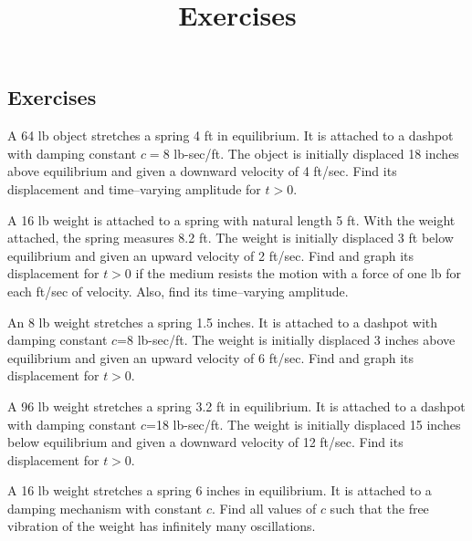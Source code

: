 \documentclass{ximera}
\title{Exercises} \license{CC BY-NC-SA 4.0}
\begin{document}
\begin{abstract}
\end{abstract}
\maketitle

\begin{onlineOnly}
\section*{Exercises}
\end{onlineOnly}

\begin{problem}\label{exer:6.2.1}
A 64 lb object stretches a spring 4 ft in equilibrium. It is attached
to a dashpot with damping constant $c=8$ lb-sec/ft. The object is
initially displaced 18 inches above equilibrium and given a downward
velocity of 4 ft/sec. Find its displacement and time--varying
amplitude for $t>0$.
\end{problem}

\begin{problem}\label{exer:6.2.2}  
A 16 lb weight is attached to a spring with natural length 5 ft. With
the weight attached, the spring measures 8.2 ft. The weight is
initially displaced 3 ft below equilibrium and given an upward
velocity of 2 ft/sec. Find and graph its displacement
 for $t>0$ if the medium resists the motion with a force of
one lb for each ft/sec of velocity. Also, find its time--varying amplitude.
\end{problem}

\begin{problem}\label{exer:6.2.3}  
An 8 lb weight stretches a spring 1.5 inches. It is attached to a
dashpot with damping constant $c$=8 lb-sec/ft. The weight is
initially displaced 3 inches above equilibrium and given an upward
velocity of 6 ft/sec. Find and graph its displacement for $t>0$.
\end{problem}

\begin{problem}\label{exer:6.2.4}
A 96 lb weight stretches a spring 3.2 ft in equilibrium. It is
attached to a dashpot with damping constant $c$=18 lb-sec/ft. The
weight is initially displaced 15 inches below equilibrium and given a
downward velocity of 12 ft/sec. Find its displacement for $t>0$.
\end{problem}

\begin{problem}\label{exer:6.2.5}
  A 16 lb weight  stretches a spring 6 inches in equilibrium.
It is attached to a damping mechanism with constant $c$.  Find all values
of $c$ such that the free vibration of the weight has infinitely many
oscillations.
\end{problem}
\end{document}
